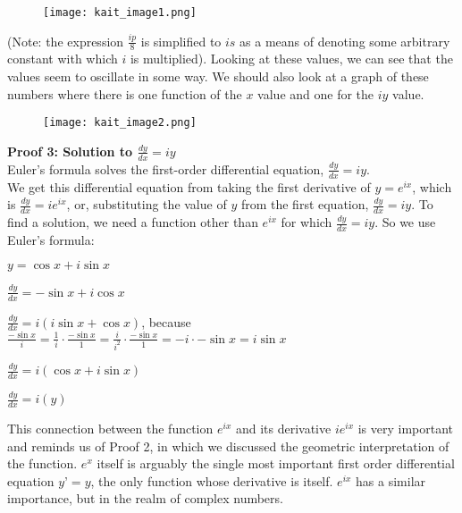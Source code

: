 \documentclass{article}
\theoremstyle{definition}
\begin{document}
\begin{figure}[h!]
\begin{center}
\texttt{[image: kait\_image1.png]} 
\end{center}
\end{figure}

\noindent
(Note: the expression $\frac{ip}{8}$ is simplified to $is$ as a means of denoting some arbitrary constant with which $i$ is multiplied). Looking at these values, we can see that the values seem to oscillate in some way. We should also look at a graph of these numbers where there is one function of the $x$ value and one for the $iy$ value.

\begin{figure}[h!]
\begin{center}
\texttt{[image: kait\_image2.png]} 
\end{center}
\end{figure}


\noindent
\textbf{Proof 3: Solution to $\frac{dy}{dx}=iy$}
\vspace{5mm} %
\\
\noindent
Euler’s formula solves the first-order differential equation, $\frac{dy}{dx}=iy$.
\vspace{5mm} %
\\
\noindent
We get this differential equation from taking the first derivative of $y=e^{ix}$, which is $\frac{dy}{dx}=ie^{ix}$, or, substituting the value of $y$ from the first equation, $\frac{dy}{dx}=iy$. To find a solution, we need a function other than $e^{ix}$ for which $\frac{dy}{dx}=iy$. So we use Euler’s formula:

\begin{center}
$y=\cos x + i\sin x$

$\frac{dy}{dx}= -\sin x + i\cos x$

$\frac{dy}{dx}= i(i\sin x + \cos x)$, because $\frac{-\sin x}{i}=\frac{1}{i} \cdot \frac{-\sin x}{1} = \frac{i}{i^2} \cdot \frac{-\sin x}{1} = -i \cdot -\sin x = i\sin x$

$\frac{dy}{dx} = i(\cos x + i\sin x)$

$\frac{dy}{dx} = i(y)$

\end{center}

\noindent
This connection between the function $e^{ix}$ and its derivative $ie^{ix}$ is very important and reminds us of Proof 2, in which we discussed the geometric interpretation of the function. $e^x$ itself is arguably the single most important first order differential equation $y’=y$, the only function whose derivative is itself. $e^{ix}$ has a similar importance, but in the realm of complex numbers.
\end{document}
